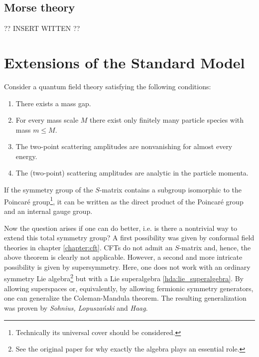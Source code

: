 \subsection{Morse theory}

    ?? INSERT WITTEN ??

\section{Extensions of the Standard Model}

    \begin{theorem}
        Consider a quantum field theory satisfying the following conditions:
        \begin{enumerate}
            \item There exists a mass gap.
            \item For every mass scale $M$ there exist only finitely many particle species with mass $m\leq M$.
            \item The two-point scattering amplitudes are nonvanishing for almost every energy.
            \item The (two-point) scattering amplitudes are analytic in the particle momenta.
        \end{enumerate}
        If the symmetry group of the $S$-matrix contains a subgroup isomorphic to the Poincar\'e group\footnote{Technically its universal cover should be considered.}, it can be written as the direct product of the Poincar\'e group and an internal gauge group.
    \end{theorem}

    Now the question arises if one can do better, i.e. is there a nontrivial way to extend this total symmetry group? A first possibility was given by conformal field theories in chapter \ref{chapter:cft}. CFTs do not admit an $S$-matrix and, hence, the above theorem is clearly not applicable. However, a second and more intricate possibility is given by supersymmetry. Here, one does not work with an ordinary symmetry Lie algebra\footnote{See the original paper \cite{coleman_mandula} for why exactly the algebra plays an essential role.} but with a Lie superalgebra \ref{hda:lie_superalgebra}. By allowing superspaces or, equivalently, by allowing fermionic symmetry generators, one can generalize the Coleman-Mandula theorem. The resulting generalization was proven by \textit{Sohnius, Lopusza\'nski} and \textit{Haag}.